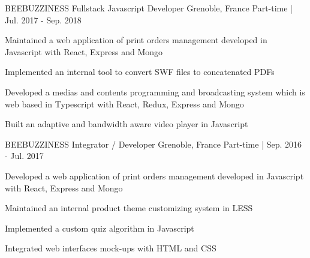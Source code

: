 

\begin{cventries}

  \cventry
  	{BEEBUZZINESS} %
    {Fullstack Javascript Developer} %
    {Grenoble, France} %
    {Part-time | Jul. 2017 - Sep. 2018} %
    {
      \begin{cvitems} %
        \item {Maintained a web application of print orders management developed in Javascript with React, Express and Mongo}
        \item {Implemented an internal tool to convert SWF files to concatenated PDFs}
        \item {Developed a medias and contents programming and broadcasting system which is web based in Typescript with React, Redux, Express and Mongo}
        \item {Built an adaptive and bandwidth aware video player in Javascript}
      \end{cvitems}
    }

  \cventry
  	{BEEBUZZINESS} %
    {Integrator / Developer} %
    {Grenoble, France} %
    {Part-time | Sep. 2016 - Jul. 2017} %
    {
      \begin{cvitems} %
        \item {Developed a web application of print orders management developed in Javascript with React, Express and Mongo}
        \item {Maintained an internal product theme customizing system in LESS}
        \item {Implemented a custom quiz algorithm in Javascript}
        \item {Integrated web interfaces mock-ups with HTML and CSS}
      \end{cvitems}
    }

\end{cventries}
